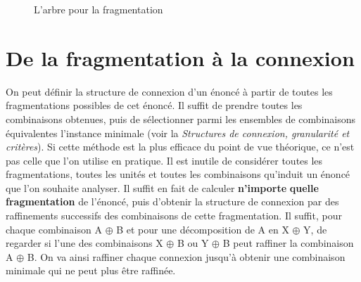 \begin{figure}
\caption{\label{fig:}L’arbre pour la fragmentation }
\end{figure}

\section{De la fragmentation à la connexion}\label{sec:3.2.22}

On peut définir la structure de connexion d’un énoncé à partir de toutes les fragmentations possibles de cet énoncé. Il suffit de prendre toutes les combinaisons obtenues, puis de sélectionner parmi les ensembles de combinaisons équivalentes l’instance minimale (voir la  \textit{Structures de connexion, granularité et critères}). Si cette méthode est la plus efficace du point de vue théorique, ce n’est pas celle que l’on utilise en pratique. Il est inutile de considérer toutes les fragmentations, toutes les unités et toutes les combinaisons qu’induit un énoncé que l’on souhaite analyser. Il suffit en fait de calculer \textbf{n’importe} \textbf{quelle fragmentation} de l’énoncé, puis d’obtenir la structure de connexion par des raffinements successifs des combinaisons de cette fragmentation. Il suffit, pour chaque combinaison A ${\oplus}$ B et pour une décomposition de A en X ${\oplus}$ Y, de regarder si l’une des combinaisons X ${\oplus}$ B ou Y ${\oplus}$ B peut raffiner la combinaison A ${\oplus}$ B. On va ainsi raffiner chaque connexion jusqu’à obtenir une combinaison minimale qui ne peut plus être raffinée.

